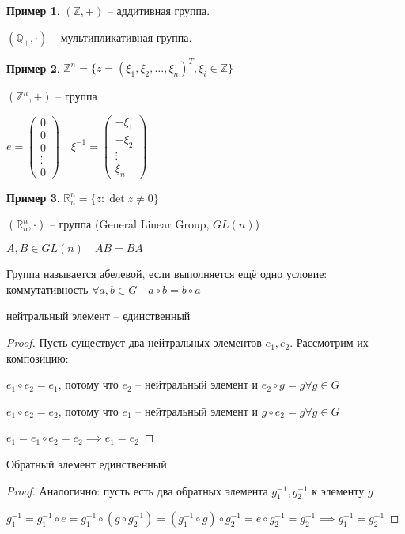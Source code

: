 \documentclass{book}
\newcommand\R{\ensuremath{\mathbb{R}}}
\newcommand\Z{\ensuremath{\mathbb{Z}}}
\newcommand\Q{\ensuremath{\mathbb{Q}}}
\theoremstyle{definition}
\newtheorem*{example}{Пример}
\begin{document}
\begin{example}
    $(\Z , +)$ -- аддитивная группа.

    $(\Q_+, \cdot ) $ -- мультипликативная группа. 
\end{example}
\begin{example}
    $\Z ^n = \{z = (\xi_1, \xi_2, \ldots, \xi_n)^T, \xi_i\in \Z \}$

    $\left( \Z^n, + \right) $ -- группа

    $e = \begin{pmatrix} 0 \\0\\0\\ \vdots\\0 \end{pmatrix}\quad \xi^{-1} = \begin{pmatrix} -\xi_1\\-\xi_2 \\ \vdots \\ \xi_n \end{pmatrix}  $
\end{example}
\begin{example}
    $\R_n^n = \{z:\det z \neq 0\}$
    
    $\left( \R^n_n, \cdot  \right) $ -- группа (General Linear Group, $GL(n)$)

    $A, B\in GL(n)\quad AB = BA$
\end{example}

\begin{definition}
    Группа называется абелевой, если выполняется ещё одно условие: коммутативность $\forall a, b\in G\quad a\circ b = b\circ a$
\end{definition}
\begin{lemma}
    нейтральный элемент -- единственный
\end{lemma}
\begin{proof}
    Пусть существует два нейтральных элементов $e_1, e_2$. Рассмотрим их композицию:

    $e_1\circ e_2 = e_1$, потому что $e_2$ -- нейтральный элемент и $e_2\circ g = g \forall g\in G$

    $e_1\circ e_2 = e_2$, потому что $e_1$ -- нейтральный элемент и $g\circ e_2 = g \forall g\in G$

    $e_1 = e_1\circ e_2 = e_2 \implies  e_1=e_2$
\end{proof}

\begin{lemma}
    Обратный элемент единственный
\end{lemma}
\begin{proof}
    Аналогично: пусть есть два обратных элемента $g^{-1}_1, g_2^{-1}$ к элементу $g$

    $g^{-1}_1 = g^{-1}_1\circ e = g^{-1}_1\circ (g\circ g^{-1}_2) = (g_1^{-1}\circ g)\circ g^{-1}_2 = e\circ g^{-1}_2 = g_2^{-1} \implies g^{-1}_1 = g_2^{-1}$
\end{proof}
\end{document}
